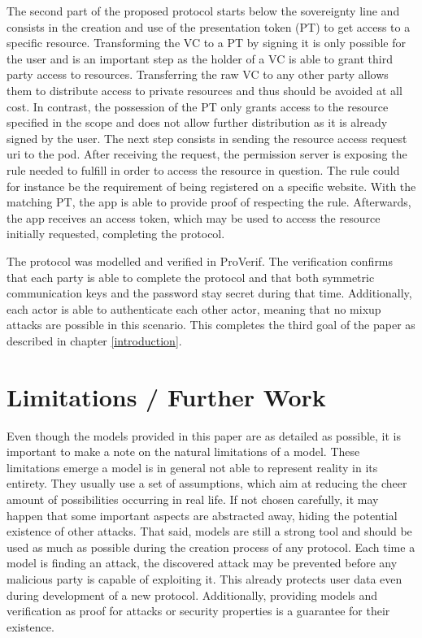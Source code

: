 \documentclass[11pt,twoside,a4paper,openright]{book}
\begin{document}
The second part of the proposed protocol starts below the sovereignty line and consists in the creation and use of the presentation token (PT) to get access to a specific resource. Transforming the VC to a PT by signing it is only possible for the user and is an important step as the holder of a VC is able to grant third party access to resources. Transferring the raw VC to any other party allows them to distribute access to private resources and thus should be avoided at all cost. In contrast, the possession of the PT only grants access to the resource specified in the scope and does not allow further distribution as it is already signed by the user. The next step consists in sending the resource access request uri to the pod. After receiving the request, the permission server is exposing the rule needed to fulfill in order to access the resource in question. The rule could for instance be the requirement of being registered on a specific website. With the matching PT, the app is able to provide proof of respecting the rule. Afterwards, the app receives an access token, which may be used to access the resource initially requested, completing the protocol.

The protocol was modelled and verified in ProVerif. The verification confirms that each party is able to complete the protocol and that both symmetric communication keys and the password stay secret during that time. Additionally, each actor is able to authenticate each other actor, meaning that no mixup attacks are possible in this scenario. This completes the third goal of the paper as described in chapter \ref{introduction}.


\chapter{Limitations / Further Work}
\label{limitations_work}

Even though the models provided in this paper are as detailed as possible, it is important to make a note on the natural limitations of a model. These limitations emerge a model is in general not able to represent reality in its entirety. They usually use a set of assumptions, which aim at reducing the cheer amount of possibilities occurring in real life. If not chosen carefully, it may happen that some important aspects are abstracted away, hiding the potential existence of other attacks. That said, models are still a strong tool and should be used as much as possible during the creation process of any protocol. Each time a model is finding an attack, the discovered attack may be prevented before any malicious party is capable of exploiting it. This already protects user data even during development of a new protocol. Additionally, providing models and verification as proof for attacks or security properties is a guarantee for their existence.
\end{document}
